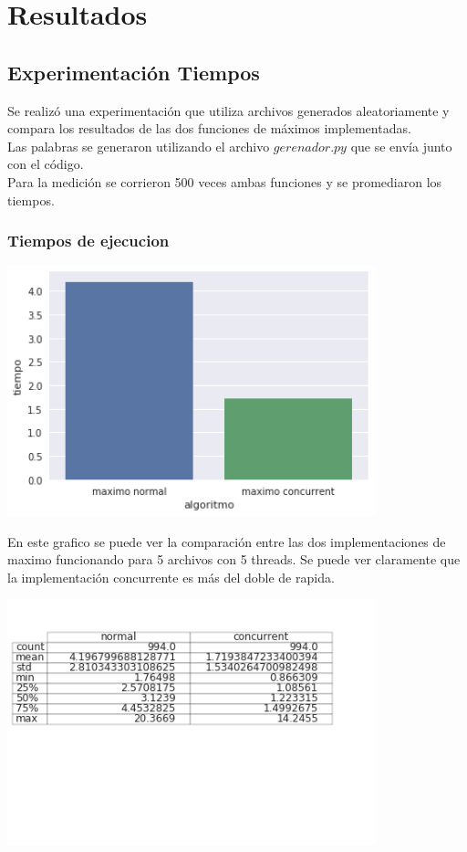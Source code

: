 \section{Resultados}


\subsection{Experimentación Tiempos}
Se realizó una experimentación que utiliza archivos generados aleatoriamente y compara los resultados de las dos funciones de máximos implementadas.\\

Las palabras se generaron utilizando el archivo $gerenador.py$ que se envía junto con el código.\\

Para la medición se corrieron 500 veces ambas funciones y se promediaron los tiempos.

\subsubsection{Tiempos de ejecucion} %

\begin{center}
\includegraphics[width=0.8\textwidth]{imagenes/maxvsmax.png}
\end{center}

En este grafico se puede ver la comparación entre las dos implementaciones de maximo funcionando
para 5 archivos con 5 threads. Se puede ver claramente que la implementación concurrente
es más del doble de rapida.

\begin{center}
\includegraphics[width=0.8\textwidth]{imagenes/descplot.png}
\end{center}

